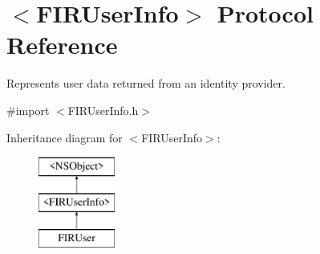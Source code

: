 \hypertarget{protocol_f_i_r_user_info-p}{}\section{$<$F\+I\+R\+User\+Info$>$ Protocol Reference}
\label{protocol_f_i_r_user_info-p}


Represents user data returned from an identity provider.  




{\ttfamily \#import $<$F\+I\+R\+User\+Info.\+h$>$}

Inheritance diagram for $<$F\+I\+R\+User\+Info$>$\+:\begin{figure}[H]
\begin{center}
\leavevmode
\includegraphics[height=3.000000cm]{protocol_f_i_r_user_info-p}
\end{center}
\end{figure}
